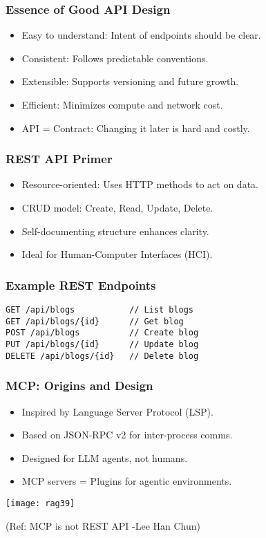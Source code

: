 \begin{frame}[fragile]\frametitle{Essence of Good API Design}
\begin{itemize}
  \item Easy to understand: Intent of endpoints should be clear.
  \item Consistent: Follows predictable conventions.
  \item Extensible: Supports versioning and future growth.
  \item Efficient: Minimizes compute and network cost.
  \item API = Contract: Changing it later is hard and costly.
\end{itemize}
\end{frame}

\begin{frame}[fragile]\frametitle{REST API Primer}
\begin{itemize}
  \item Resource-oriented: Uses HTTP methods to act on data.
  \item CRUD model: Create, Read, Update, Delete.
  \item Self-documenting structure enhances clarity.
  \item Ideal for Human-Computer Interfaces (HCI).
\end{itemize}
\end{frame}

\begin{frame}[fragile]\frametitle{Example REST Endpoints}
\begin{lstlisting}
GET /api/blogs           // List blogs
GET /api/blogs/{id}      // Get blog
POST /api/blogs          // Create blog
PUT /api/blogs/{id}      // Update blog
DELETE /api/blogs/{id}   // Delete blog
\end{lstlisting}
\end{frame}

\begin{frame}[fragile]\frametitle{MCP: Origins and Design}
\begin{itemize}
  \item Inspired by Language Server Protocol (LSP).
  \item Based on JSON-RPC v2 for inter-process comms.
  \item Designed for LLM agents, not humans.
  \item MCP servers = Plugins for agentic environments.
\end{itemize}

	\begin{center}
	\texttt{[image: rag39]}

	{\tiny (Ref: MCP is not REST API -Lee Han Chun)}
	\end{center}
		
\end{frame}

